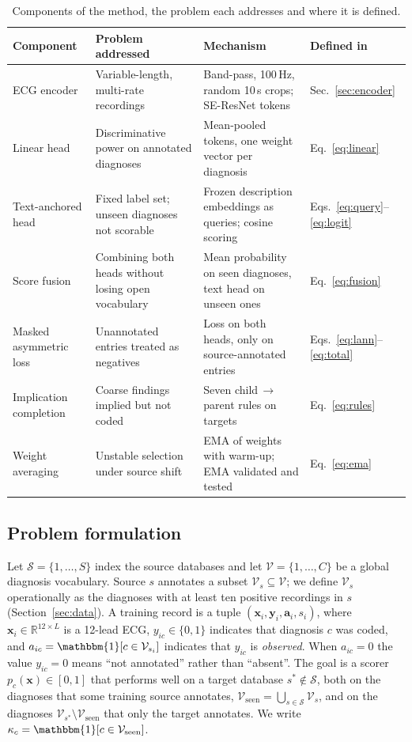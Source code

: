 \begin{table}[!htbp]
\centering\footnotesize
\caption{Components of the method, the problem each addresses and where it is defined.}\label{tab:components}
\begin{tabularx}{\textwidth}{@{}l X X l@{}}
\toprule
Component & Problem addressed & Mechanism & Defined in \\
\midrule
ECG encoder & Variable-length, multi-rate recordings & Band-pass, 100\,Hz, random 10\,s crops; SE-ResNet tokens & Sec.~\ref{sec:encoder} \\
Linear head & Discriminative power on annotated diagnoses & Mean-pooled tokens, one weight vector per diagnosis & Eq.~\eqref{eq:linear} \\
Text-anchored head & Fixed label set; unseen diagnoses not scorable & Frozen description embeddings as queries; cosine scoring & Eqs.~\eqref{eq:query}--\eqref{eq:logit} \\
Score fusion & Combining both heads without losing open vocabulary & Mean probability on seen diagnoses, text head on unseen ones & Eq.~\eqref{eq:fusion} \\
Masked asymmetric loss & Unannotated entries treated as negatives & Loss on both heads, only on source-annotated entries & Eqs.~\eqref{eq:lann}--\eqref{eq:total} \\
Implication completion & Coarse findings implied but not coded & Seven child\,$\rightarrow$\,parent rules on targets & Eq.~\eqref{eq:rules} \\
Weight averaging & Unstable selection under source shift & EMA of weights with warm-up; EMA validated and tested & Eq.~\eqref{eq:ema} \\
\bottomrule
\end{tabularx}
\end{table}

\subsection{Problem formulation}\label{sec:problem}
Let $\mathcal{S}=\{1,\dots,S\}$ index the source databases and let $\mathcal{V}=\{1,\dots,C\}$ be a global diagnosis vocabulary. Source $s$ annotates a subset $\mathcal{V}_s\subseteq\mathcal{V}$; we define $\mathcal{V}_s$ operationally as the diagnoses with at least ten positive recordings in $s$ (Section~\ref{sec:data}). A training record is a tuple $(\mathbf{x}_i, \mathbf{y}_i, \mathbf{a}_i, s_i)$, where $\mathbf{x}_i\in\mathbb{R}^{12\times L}$ is a 12-lead ECG, $y_{ic}\in\{0,1\}$ indicates that diagnosis $c$ was coded, and $a_{ic}=\mathbbm{1}[c\in\mathcal{V}_{s_i}]$ indicates that $y_{ic}$ is \emph{observed}. When $a_{ic}=0$ the value $y_{ic}=0$ means ``not annotated'' rather than ``absent''. The goal is a scorer $p_c(\mathbf{x})\in[0,1]$ that performs well on a target database $s^\ast\notin\mathcal{S}$, both on the diagnoses that some training source annotates, $\mathcal{V}_{\mathrm{seen}}=\bigcup_{s\in\mathcal{S}}\mathcal{V}_s$, and on the diagnoses $\mathcal{V}_{s^\ast}\setminus\mathcal{V}_{\mathrm{seen}}$ that only the target annotates. We write $\kappa_c=\mathbbm{1}[c\in\mathcal{V}_{\mathrm{seen}}]$.

